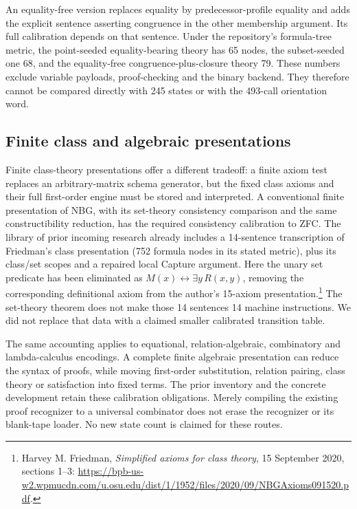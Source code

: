 An equality-free version replaces equality by predecessor-profile
equality and adds the explicit sentence asserting congruence in
the other membership argument.  Its full calibration depends on
that sentence.  Under the repository's formula-tree metric, the
point-seeded equality-bearing theory has 65 nodes, the subset-seeded
one 68, and the equality-free congruence-plus-closure theory 79.
These numbers exclude variable payloads, proof-checking and the
binary backend.  They therefore cannot be compared directly with
245 states or with the 493-call orientation word.

\subsection{Finite class and algebraic presentations}

Finite class-theory presentations offer a different tradeoff: a
finite axiom test replaces an arbitrary-matrix schema generator,
but the fixed class axioms and their full first-order engine must
be stored and interpreted.  A conventional finite presentation of
NBG, with its set-theory consistency comparison and the same
constructibility reduction, has the required consistency
calibration to ZFC.  The library of prior incoming
research already includes a 14-sentence transcription of Friedman's
class presentation (752 formula nodes in its stated metric),
plus its class/set scopes and a repaired local Capture argument.
Here the unary set predicate has been eliminated as
$M(x)\leftrightarrow\exists y\,R(x,y)$, removing the corresponding
definitional axiom from the author's 15-axiom presentation.\footnote{
Harvey M. Friedman, \emph{Simplified axioms for class theory},
15 September 2020, sections 1--3:
\url{https://bpb-us-w2.wpmucdn.com/u.osu.edu/dist/1/1952/files/2020/09/NBGAxioms091520.pdf}.}
The set-theory theorem does not make those 14 sentences 14 machine
instructions.  We did not replace that data with a claimed smaller
calibrated transition table.

The same accounting applies to equational, relation-algebraic,
combinatory and lambda-calculus encodings.  A complete finite
algebraic presentation can reduce the syntax of proofs, while
moving first-order substitution, relation pairing, class theory
or satisfaction into fixed terms.  The prior inventory
and the concrete development
 retain these
calibration obligations.  Merely compiling the existing proof
recognizer to a universal combinator does not erase the recognizer
or its blank-tape loader.  No new state count is claimed for these
routes.

